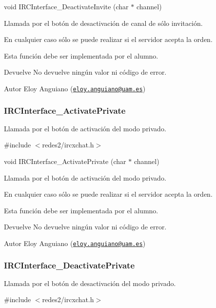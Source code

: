 void I\-R\-C\-Interface\-\_\-\-Deactivate\-Invite (char $\ast$ channel)

Llamada por el botón de desactivación de canal de sólo invitación.

En cualquier caso sólo se puede realizar si el servidor acepta la orden.

Esta función debe ser implementada por el alumno.

\begin{DoxyReturn}{Devuelve}
No devuelve ningún valor ni código de error.
\end{DoxyReturn}
\begin{DoxyAuthor}{Autor}
Eloy Anguiano (\href{mailto:eloy.anguiano@uam.es}{\tt eloy.\-anguiano@uam.\-es})
\end{DoxyAuthor}


 \hypertarget{IRCInterface_ActivatePrivate}{}\subsubsection{I\-R\-C\-Interface\-\_\-\-Activate\-Private}\label{IRCInterface_ActivatePrivate}
Llamada por el botón de activación del modo privado.

\#include $<$redes2/ircxchat.\-h$>$

void I\-R\-C\-Interface\-\_\-\-Activate\-Private (char $\ast$ channel)

Llamada por el botón de activación del modo privado.

En cualquier caso sólo se puede realizar si el servidor acepta la orden.

Esta función debe ser implementada por el alumno.

\begin{DoxyReturn}{Devuelve}
No devuelve ningún valor ni código de error.
\end{DoxyReturn}
\begin{DoxyAuthor}{Autor}
Eloy Anguiano (\href{mailto:eloy.anguiano@uam.es}{\tt eloy.\-anguiano@uam.\-es})
\end{DoxyAuthor}


 \hypertarget{IRCInterface_DeactivatePrivate}{}\subsubsection{I\-R\-C\-Interface\-\_\-\-Deactivate\-Private}\label{IRCInterface_DeactivatePrivate}
Llamada por el botón de desactivación del modo privado.

\#include $<$redes2/ircxchat.\-h$>$

